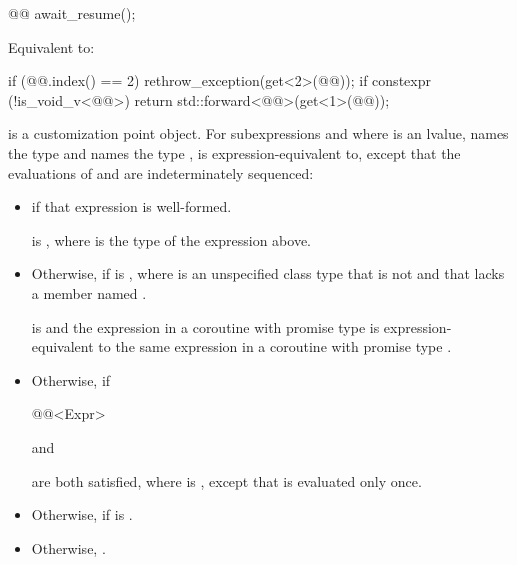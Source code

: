 \begin{itemdecl}
@@ await_resume();
\end{itemdecl}

\begin{itemdescr}
\pnum
\effects
Equivalent to:
\begin{codeblock}
if (@@.index() == 2)
  rethrow_exception(get<2>(@@));
if constexpr (!is_void_v<@@>)
  return std::forward<@@>(get<1>(@@));
\end{codeblock}
\end{itemdescr}

\pnum
{} is a customization point object.
For subexpressions  and 
where  is an lvalue,
 names the type  and
 names the type ,
 is expression-equivalent to,
except that the evaluations of  and 
are indeterminately sequenced:
\begin{itemize}
\item
{} if that expression is well-formed.

\mandates
{} is ,
where  is the type of the expression above.
\item
Otherwise, 
if  is ,
where  is an unspecified class type
that is not  and
that lacks a member named .

\expects
{} is  and
the expression 
in a coroutine with promise type  is expression-equivalent to
the same expression in a coroutine with promise type .
\item
Otherwise, 
if
\begin{codeblock}
@@<Expr>
\end{codeblock}
and
\begin{codeblock}
@@<decltype((@@)), Promise>}
\end{codeblock}
are both satisfied, where  is
,
except that  is evaluated only once.
\item
Otherwise, 
if  is .
\item
Otherwise, .
\end{itemize}

